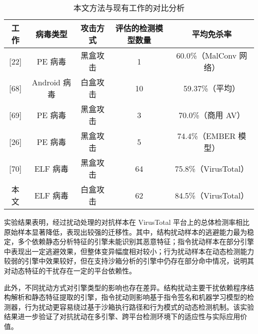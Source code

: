 \begin{conclusion}
\begin{table}[htbp]
	\centering
	\caption{本文方法与现有工作的对比分析}
	\label{tab:5.14}
	\begin{tabular*}{\textwidth}{@{\extracolsep{\fill}}ccccc}
		\toprule
		工作 & 病毒类型 & 攻击方式 & 评估的检测模型数量 & 平均免杀率 \\
		\midrule
		{[22]} & PE 病毒 & 黑盒攻击 & 1 & 60.0\%（MalConv 网络） \\
		{[68]} & Android 病毒 & 白盒攻击 & 10 & 59.37\%（平均） \\
		{[69]} & PE 病毒 & 黑盒攻击 & 3 & 70.0\%（商用 AV） \\
		{[26]} & PE 病毒 & 黑盒攻击 & 5 & 74.4\%（EMBER 模型） \\
		{[70]} & ELF 病毒 & 黑盒攻击 & 64 & 75.8\%（VirusTotal） \\
		本文 & ELF 病毒 & 白盒攻击 & 62 & 84.5\%（VirusTotal） \\
		\bottomrule
	\end{tabular*}
\end{table}

实验结果表明，经过扰动处理的对抗样本在 VirusTotal 平台上的总体检测率相比原始样本显著降低，表现出较强的迁移性。其中，结构扰动样本的逃避能力最为稳定，多个依赖静态分析特征的引擎未能识别其恶意特征；指令扰动样本在部分引擎中表现出一定逃避效果，但整体变异幅度相对较小；行为扰动样本在动态检测能力较弱的引擎中效果较好，但在支持沙箱分析的引擎中仍存在部分命中情况，说明其对动态特征的干扰存在一定的平台依赖性。


此外，不同扰动方式对引擎类型的影响也存在差异。结构扰动主要干扰依赖程序结构解析和静态特征提取的引擎，指令扰动则影响基于指令签名和机器学习模型的检测器，行为扰动更容易绕过基于沙箱执行路径和行为模式的动态检测机制。该实验结果进一步验证了对抗扰动在多引擎、跨平台检测环境下的适应性与实际应用价值。


\end{conclusion}
